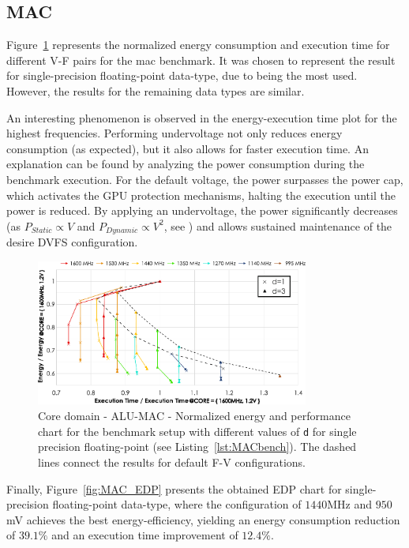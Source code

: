\subsection{MAC}

\label{sec:MAC_behaviour}
Figure~\ref{fig:MAC_behaviour} represents the normalized energy consumption and execution time for different V-F pairs for the \acrshort{mac} benchmark. It was chosen to represent the result for single-precision floating-point data-type, due to being the most used. However, the results for the remaining data types are similar.

An interesting phenomenon is observed in the energy-execution time plot for the highest frequencies. Performing undervoltage not only reduces energy consumption (as expected), but it also allows for faster execution time. An explanation can be found by analyzing the power consumption during the benchmark execution. For the default voltage, the power surpasses the power cap, which activates the GPU protection mechanisms, halting the execution until the power is reduced. By applying an undervoltage, the power significantly decreases (as $P_{Static}\propto V$ and $P_{Dynamic}\propto V^2$, see \cite{guerreiro_gpgpu_2018}) and allows sustained maintenance of the desire DVFS configuration. 

\begin{figure}[htb]
  \centering
  \includegraphics[width=0.8\textwidth]{Figures/GPU_characterization/MAC_behaviour_d_1_3.pdf}
  \caption{Core domain - ALU-MAC - Normalized energy and performance chart for the benchmark setup with different values of \texttt{d} for single precision floating-point (see Listing~\ref{lst:MACbench}). The dashed lines connect the results for default F-V configurations.}
  \label{fig:MAC_behaviour}
\end{figure}

Finally, Figure~\ref{fig:MAC_EDP} presents the obtained EDP chart for single-precision floating-point data-type, where the configuration of $1440$MHz and $950$mV achieves the best energy-efficiency, yielding an energy consumption reduction of $39.1\%$ and an execution time improvement of $12.4\%$.

